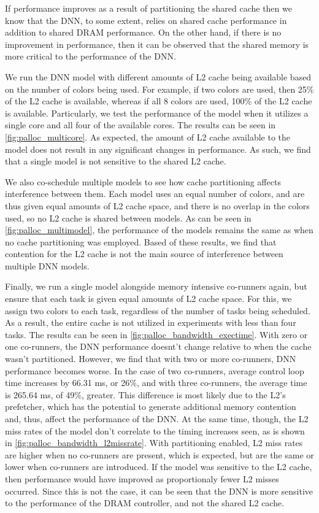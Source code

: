 If performance improves as a result of partitioning the shared cache 
then we know that the DNN, to some extent, relies on shared cache 
performance in addition to shared DRAM performance. On the other 
hand, if there is no improvement in performance, then it can be 
observed that the shared memory is more critical to the performance 
of the DNN.

We run the DNN model with different amounts of L2 cache being
available based on the number of colors being used. For example, if two 
colors are used, then 25\% of the L2 cache is available, whereas if all 
8 colors are used, 100\% of the L2 cache is available. Particularly, we 
test the performance of the model when it utilizes a single core and
all four of the available cores. The results can be seen in 
\ref{fig:palloc_multicore}. As expected, the amount of L2 cache 
available to the model does not result in any significant changes in 
performance. As such, we find that a single model is not sensitive to 
the shared L2 cache.

We also co-schedule multiple models to see how cache partitioning affects
interference between them. Each model uses an equal number of colors, and
are thus given equal amounts of L2 cache space, and there is no overlap
in the colors used, so no L2 cache is shared between models. As can be 
seen in \ref{fig:palloc_multimodel}, the performance of the models 
remains the same as when no cache partitioning was employed. Based of 
these results, we find that contention for the L2 cache is not the main
source of interference between multiple DNN models.

Finally, we run a single model alongside memory intensive co-runners 
again, but ensure that each task is given equal amounts of L2 cache space.
For this, we assign two colors to each task, regardless of the number of
tasks being scheduled. As a result, the entire cache is not utilized in
experiments with less than four tasks. The results can be seen in 
\ref{fig:palloc_bandwidth_exectime}. With zero or one co-runners, the DNN
performance doesnt't change relative to when the cache wasn't partitioned.
However, we find that with two or more co-runners, DNN performance becomes
worse. In the case of two co-runners, average control loop time increases
by 66.31 ms, or 26\%, and with three co-runners, the average time
is 265.64 ms, of 49\%, greater. This difference is most likely due to the
L2's prefetcher, which has the potential to generate additional memory
contention and, thus, affect the performance of the DNN.
At the same time, though, the L2 miss rates of the model don't correlate 
to the timing increases seen, as is shown in 
\ref{fig:palloc_bandwidth_l2missrate}. With partitioning enabled, L2 miss
rates are higher when no co-runners are present, which is expected, but 
are the same or lower when co-runners are introduced. If the model was 
sensitive to the L2 cache, then performance would have improved as 
proportionaly fewer L2 misses occurred. Since this is not the case, it 
can be seen that the DNN is more sensitive to the performance of the DRAM
controller, and not the shared L2 cache.

